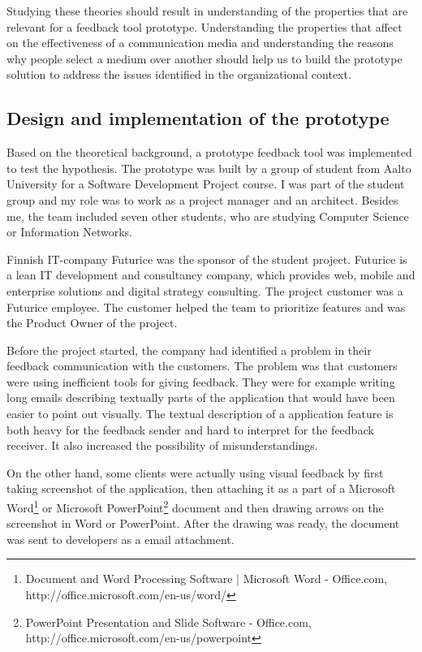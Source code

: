 \documentclass[english,12pt,a4paper,pdftex]{article}
\begin{document}
Studying these theories should result in understanding of the properties that are relevant for a feedback tool prototype. Understanding the properties that affect on the effectiveness of a communication media and understanding the reasons why people select a medium over another should help us to build the prototype solution to address the issues identified in the organizational context.

\subsection{Design and implementation of the prototype}

Based on the theoretical background, a prototype feedback tool was implemented to test the hypothesis. The prototype was built by a group of student from Aalto University for a Software Development Project course. I was part of the student group and my role was to work as a project manager and an architect. Besides me, the team included seven other students, who are studying Computer Science or Information Networks.

Finnish IT-company Futurice was the sponsor of the student project. Futurice is a lean IT development and consultancy company, which provides web, mobile and enterprise solutions and digital strategy consulting. The project customer was a Futurice employee. The customer helped the team to prioritize features and was the Product Owner of the project. 

Before the project started, the company had identified a problem in their feedback communication with the customers. The problem was that customers were using inefficient tools for giving feedback. They were for example writing long emails describing textually parts of the application that would have been easier to point out visually. The textual description of a application feature is both heavy for the feedback sender and hard to interpret for the feedback receiver. It also increased the possibility of misunderstandings.

On the other hand, some clients were actually using visual feedback by first taking screenshot of the application, then attaching it as a part of a Microsoft Word\footnote{Document and Word Processing Software | Microsoft Word - Office.com, http://office.microsoft.com/en-us/word/} or Microsoft PowerPoint\footnote{PowerPoint Presentation and Slide Software - Office.com, http://office.microsoft.com/en-us/powerpoint} document and then drawing arrows on the screenshot in Word or PowerPoint. After the drawing was ready, the document was sent to developers as a email attachment. 
\end{document}
